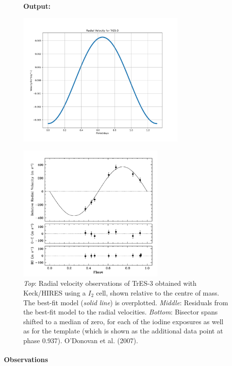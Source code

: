 \documentclass[11pt]{article}
\newcommand*{\figuretitle}[1]{
    	{\textbf{#1}
    	\par\vspace{-1em}}
    }
\begin{document}
\begin{figure}[!hbt]
	\figuretitle{Output:}
	\centering
	\includegraphics[width=0.75\textwidth]{../matplotlib_graphs/radial_velocity_2.png}
\end{figure} 

    
\begin{figure}[H]
	\centering
	\includegraphics[width=0.65\textwidth]{../images/TrE-S_radial_velocity.png}
	\caption{{\it Top}: Radial velocity observations of TrES-3 obtained with Keck/HIRES using a $I_{2}$ cell, shown relative to the centre of mass. The best-fit model ({\it solid line}) is overplotted. {\it Middle}: Residuals from the best-fit model to the radial velocities. {\it Bottom}: Bisector spans shifted to a median of zero, for each of the iodine exposures as well as for the template (which is shown as the additional data point at phase 0.937). O'Donovan et al. (2007).} \label{Figure 4.d}
\end{figure}    


    \hypertarget{observations}{%
\paragraph{Observations}\label{observations_4}}
\end{document}
